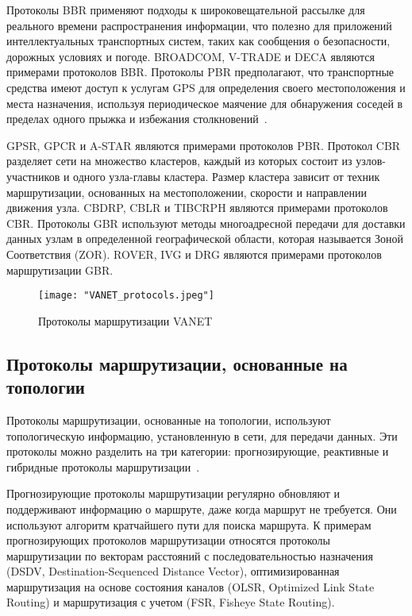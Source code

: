 Протоколы BBR применяют подходы к широковещательной рассылке для реального времени распространения информации, что полезно для приложений интеллектуальных транспортных систем, таких как сообщения о безопасности, дорожных условиях и погоде. BROADCOM, V-TRADE и DECA являются примерами протоколов BBR. Протоколы PBR предполагают, что транспортные средства имеют доступ к услугам GPS для определения своего местоположения и места назначения, используя периодическое маячение для обнаружения соседей в пределах одного прыжка и избежания столкновений~\cite{karunakar2020analysis}.

GPSR, GPCR и A-STAR являются примерами протоколов PBR. Протокол CBR разделяет сети на множество кластеров, каждый из которых состоит из узлов-участников и одного узла-главы кластера. Размер кластера зависит от техник маршрутизации, основанных на местоположении, скорости и направлении движения узла. CBDRP, CBLR и TIBCRPH являются примерами протоколов CBR. Протоколы GBR используют методы многоадресной передачи для доставки данных узлам в определенной географической области, которая называется Зоной Соответствия (ZOR). ROVER, IVG и DRG являются примерами протоколов маршрутизации GBR.

\begin{figure}[!h]
    \centering
    \texttt{[image: "VANET\_protocols.jpeg"]}
    \caption{Протоколы маршрутизации VANET}
    \label{fig:vanet_protocols}
\end{figure}

\subsection{Протоколы маршрутизации, основанные на топологии}

Протоколы маршрутизации, основанные на топологии, используют топологическую информацию, установленную в сети, для передачи данных. Эти протоколы можно разделить на три категории: прогнозирующие, реактивные и гибридные протоколы маршрутизации~\cite{kaur2013comparative, garg2012review}.

Прогнозирующие протоколы маршрутизации регулярно обновляют и поддерживают информацию о маршруте, даже когда маршрут не требуется. Они используют алгоритм кратчайшего пути для поиска маршрута. К примерам прогнозирующих протоколов маршрутизации относятся протоколы маршрутизации по векторам расстояний с последовательностью назначения (DSDV, Destination-Sequenced Distance Vector), оптимизированная маршрутизация на основе состояния каналов (OLSR, Optimized Link State Routing) и маршрутизация с учетом  (FSR, Fisheye State Routing).

